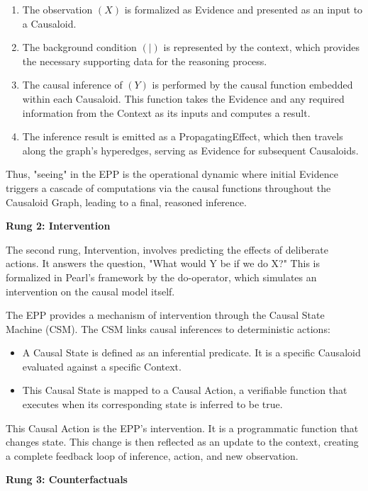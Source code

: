 \begin{enumerate}
	\item The observation $(X)$ is formalized as Evidence and presented as an input to a Causaloid.
	\item The background condition $(|)$ is represented by the context, which provides the necessary supporting data for the reasoning process.
	\item The causal inference of $(Y)$ is performed by the causal function embedded within each Causaloid. This function takes the Evidence and any required information from the Context as its inputs and computes a result.
	\item The inference result is emitted as a PropagatingEffect, which then travels along the graph's hyperedges, serving as Evidence for subsequent Causaloids.
\end{enumerate}

Thus, "seeing" in the EPP is the operational dynamic where initial Evidence triggers a cascade of computations via the causal functions throughout the Causaloid Graph, leading to a final, reasoned inference.

\textbf{Rung 2: Intervention}

The second rung, Intervention, involves predicting the effects of deliberate actions. It answers the question, "What would Y be if we do X?" This is formalized in Pearl's framework by the do-operator, which simulates an intervention on the causal model itself.

The EPP provides a mechanism of intervention through the Causal State Machine (CSM). 
The CSM  links causal inferences to deterministic actions:

\begin{itemize}
	\item A Causal State is defined as an inferential predicate. It is a specific Causaloid evaluated against a specific Context.
	\item This Causal State is mapped to a Causal Action, a verifiable function that executes when its corresponding state is inferred to be true.

\end{itemize}

This Causal Action is the EPP's intervention. It is a programmatic function that changes state. 
This change is then reflected as an update to the context, creating a complete feedback loop of inference, action, and new observation.

\textbf{Rung 3: Counterfactuals}

